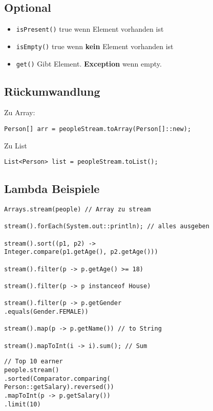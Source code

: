\begin{multicols*}{5}
	\subsection{Optional}
		\begin{itemize}
			\item \tiny \textcolor{b}{\texttt{isPresent()}}
				\footnotesize true wenn Element vorhanden ist
			\item \tiny \textcolor{b}{\texttt{isEmpty()}}
				\footnotesize true wenn \textbf{kein} Element vorhanden ist
			\item \tiny \textcolor{b}{\texttt{get()}}
				\footnotesize Gibt Element. \textbf{Exception} wenn empty.
		\end{itemize}
	\subsection{Rückumwandlung}
		\textcolor{b}{Zu Array:}
		\begin{lstlisting}
Person[] arr = peopleStream.toArray(Person[]::new);
		\end{lstlisting}
		\textcolor{b}{Zu List}
		\begin{lstlisting}
List<Person> list = peopleStream.toList();
		\end{lstlisting}	
	
		\subsection{Lambda Beispiele}
	\begin{lstlisting}
Arrays.stream(people) // Array zu stream

stream().forEach(System.out::println); // alles ausgeben

stream().sort((p1, p2) -> 
Integer.compare(p1.getAge(), p2.getAge()))

stream().filter(p -> p.getAge() >= 18)

stream().filter(p -> p instanceof House)

stream().filter(p -> p.getGender
.equals(Gender.FEMALE))

stream().map(p -> p.getName()) // to String

stream().mapToInt(i -> i).sum(); // Sum
	\end{lstlisting}
	\columnbreak %
	\begin{lstlisting}
// Top 10 earner
people.stream()
.sorted(Comparator.comparing(
Person::getSalary).reversed())
.mapToInt(p -> p.getSalary())
.limit(10)



\end{lstlisting}
\end{multicols*}

